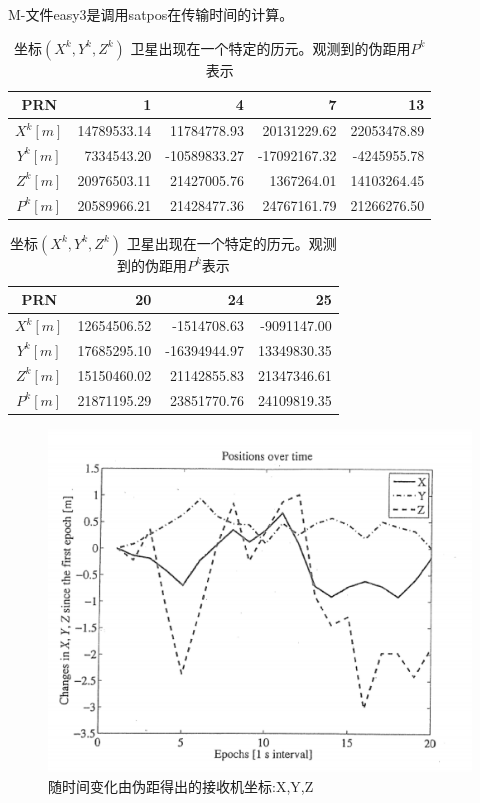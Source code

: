 	M-文件easy3是调用satpos在传输时间的计算。
	\begin{table}
		\caption{坐标$(X^k,Y^k,Z^k)$ 卫星出现在一个特定的历元。观测到的伪距用$P^k$表示}
		\label{tab:9.4}
		\begin{tabular}{crrrr}
			\hline
			PRN & 1 & 4 & 7 & 13 \\ 
			\hline
			$X^k[m]$ & 14789533.14 &  11784778.93 &  20131229.62 & 22053478.89  \\ 
			$Y^k[m]$ &  7334543.20 & -10589833.27 & -17092167.32 & -4245955.78  \\ 
			$Z^k[m]$ & 20976503.11 &  21427005.76 &   1367264.01 & 14103264.45  \\ 
			$P^k[m]$ & 20589966.21 &  21428477.36 &  24767161.79 & 21266276.50  \\ 
			\hline
		\end{tabular} 
		\begin{tabular}{crrr}
			\hline
			PRN & 20 & 24 & 25 \\
			\hline
			$X^k[m]$ & 12654506.52 &  -1514708.63 & -9091147.00 \\
			$Y^k[m]$ & 17685295.10 & -16394944.97 & 13349830.35 \\ 
			$Z^k[m]$ & 15150460.02 &  21142855.83 & 21347346.61 \\ 
			$P^k[m]$ & 21871195.29 &  23851770.76 & 24109819.35 \\ 
			\hline
		\end{tabular}
	\end{table}	
	
	\begin{figure}
		\centering
		\includegraphics[width=0.7\linewidth]{TeX_files/Part03/chapter09/image/9-14}
		\caption{随时间变化由伪距得出的接收机坐标:X,Y,Z}
		\label{fig:9-14}
	\end{figure}
	
